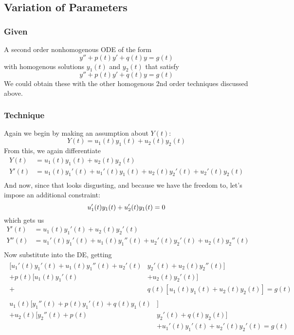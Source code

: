 \documentclass[11pt]{article}
\begin{document}
\subsection{Variation of Parameters}
\subsubsection{Given}
A second order nonhomogenous ODE of the form
    \[ y'' + p(t)y' + q(t)y = g(t) \]
with homogenous solutions $y_1(t)$ and $y_2(t)$ that satisfy
    \[ y'' + p(t)y' + q(t)y = g(t) \]
We could obtain these with the other homogenous 2nd order techniques discussed above. 
\subsubsection{Technique}
Again we begin by making an assumption about $Y(t)$: 
    \[ Y(t) = u_1(t)y_1(t) + u_2(t)y_2(t) \]
From this, we again differentiate
\begin{align*}
    Y(t) &= u_1(t)y_1(t) + u_2(t)y_2(t) \\
    Y'(t) &= u_1(t)y_1'(t) + u_1'(t)y_1(t) + u_2(t)y_2'(t) + u_2'(t)y_2(t) \\
\end{align*}
And now, since that looks disgusting, and because we have the freedom to, let's impose an additional constraint:
\begin{equation}
u_1'(t)y_1(t) + u_2'(t)y_1(t) = 0  \\
\end{equation}
which gets us
\begin{align*}
    Y'(t) &= u_1(t)y_1'(t) + u_2(t)y_2'(t)\\
    Y''(t) &= u_1'(t)y_1'(t) + u_1(t)y_1''(t) + u_2'(t)y_2'(t) + u_2(t)y_2''(t) \\
\end{align*}
Now substitute into the DE, getting
\begin{eqnarray*}
\begin{split}
    [ u_1'(t)y_1'(t) + u_1(t)y_1''(t) + u_2'(t)&y_2'(t) + u_2(t)y_2''(t)] \\
    + p(t)[ u_1(t)y_1'(t) &+ u_2(t)y_2'(t)]  \\
    + &q(t)\left[ u_1(t)y_1(t) + u_2(t)y_2(t) \right] = g(t)
\end{split}
\end{eqnarray*}
\begin{eqnarray*}
\begin{split}
   u_1(t)[y_1''(t) + p(t)y_1'(t) + q(t)y_1(t)&] \\
   + u_2(t)[y_2''(t) + p(t)&y_2'(t) + q(t)y_2(t)] \\
   &+ u_1'(t)y_1'(t) + u_2'(t)y_2'(t) = g(t)
\end{split}
\end{eqnarray*}
\end{document}
